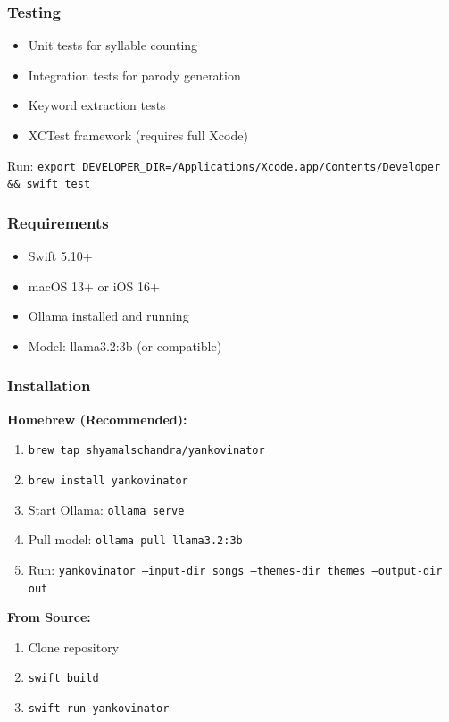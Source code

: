 \documentclass[aspectratio=169]{beamer}
\begin{document}
\begin{frame}
\frametitle{Testing}
\begin{itemize}
    \item Unit tests for syllable counting
    \item Integration tests for parody generation
    \item Keyword extraction tests
    \item XCTest framework (requires full Xcode)
\end{itemize}

Run: \texttt{export DEVELOPER\_DIR=/Applications/Xcode.app/Contents/Developer \&\& swift test}
\end{frame}

\begin{frame}
\frametitle{Requirements}
\begin{itemize}
    \item Swift 5.10+
    \item macOS 13+ or iOS 16+
    \item Ollama installed and running
    \item Model: llama3.2:3b (or compatible)
\end{itemize}
\end{frame}

\begin{frame}
\frametitle{Installation}
\textbf{Homebrew (Recommended):}
\begin{enumerate}
    \item \texttt{brew tap shyamalschandra/yankovinator}
    \item \texttt{brew install yankovinator}
    \item Start Ollama: \texttt{ollama serve}
    \item Pull model: \texttt{ollama pull llama3.2:3b}
    \item Run: \texttt{yankovinator --input-dir songs --themes-dir themes --output-dir out}
\end{enumerate}

\textbf{From Source:}
\begin{enumerate}
    \item Clone repository
    \item \texttt{swift build}
    \item \texttt{swift run yankovinator}
\end{enumerate}
\end{frame}
\end{document}
